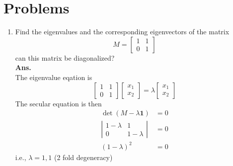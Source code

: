 	\section{Problems}
	\begin{enumerate}
		\item Find the eigenvalues and the corresponding eigenvectors of the matrix
		\begin{equation}
			M = \left[\begin{matrix}
			1 & 1 \\ 0 & 1
			\end{matrix}\right]
		\end{equation}
		can this matrix be diagonalized?\\
		
		\textbf{Ans.}\\
		The eigenvalue eqation is
		\begin{equation}
		\left[
			\begin{matrix}
				1 & 1 \\ 0 & 1
			\end{matrix}
			\right]
			\left[\begin{matrix}
			x_1 \\ x_2
			\end{matrix}\right] 
			= 
			\lambda 
			\left[\begin{matrix}
			x_1 \\ x_2
			\end{matrix}\right]
		\end{equation}
		The secular equation is then 
		\begin{eqnarray}
			\det(M - \lambda \mathbf{1}) &= 0 \nonumber\\
			\left|\begin{matrix}
			1-\lambda & 1 \\ 0 & 1-\lambda
			\end{matrix}\right| &=0 \nonumber \\
			\left(1-\lambda\right)^2 &= 0 \nonumber
		\end{eqnarray}
		i.e., $\lambda = 1,1$ (2 fold degeneracy)\\
		

\end{enumerate}
